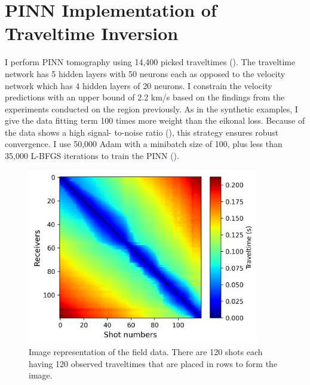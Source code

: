 \section{PINN Implementation of Traveltime Inversion}
\label{sec:pinn_implementation}

I perform PINN tomography using 14,400 picked traveltimes (). The traveltime network has 5 hidden layers with 50 neurons each as opposed to the velocity network which has 4 hidden layers of 20 neurons. I constrain the velocity predictions with an upper bound of 2.2 km/s based on the findings from the experiments conducted on the region previously. As in the synthetic examples, I give the data fitting term 100 times more weight than the eikonal loss. Because of the data shows a high signal- to-noise ratio (), this strategy ensures robust convergence. I use 50,000 Adam with a minibatch size of 100, plus less than 35,000 L-BFGS iterations to train the PINN ().

\begin{figure}
 \centering
 \includegraphics[width=0.9\textwidth]{figures/chap04_field_data/data} 
 \caption{Image representation of the field data. There are 120 shots each having 120 observed traveltimes that are placed in rows to form the image.}
 \label{fig:data}
\end{figure}

